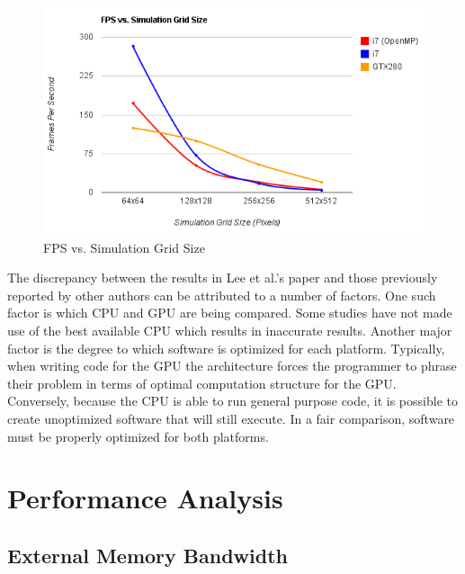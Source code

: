 \documentclass[conference]{IEEEtran}
\begin{document}
\begin{figure}[b]
	\centering
	\includegraphics[scale=0.5]{chart}
\caption{FPS vs. Simulation Grid Size}
\end{figure}

The discrepancy between the results in Lee et al.'s paper and those previously reported by other authors can be attributed to a number of factors. One such factor is which CPU and GPU are being compared. Some studies have not made use of the best available CPU which results in inaccurate results. Another major factor is the degree to which software is optimized for each platform. Typically, when writing code for the GPU the architecture forces the programmer to phrase their problem in terms of optimal computation structure for the GPU. Conversely, because the CPU is able to run general purpose code, it is possible to create unoptimized software that will still execute. In a fair comparison, software must be properly optimized for both platforms.

\section{Performance Analysis}

\subsection{External Memory Bandwidth}
\end{document}
